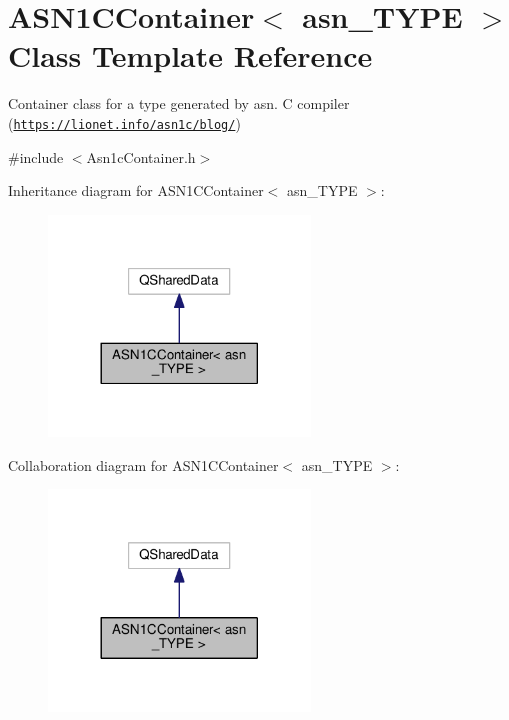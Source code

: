 \hypertarget{classASN1CContainer}{}\section{A\+S\+N1\+C\+Container$<$ asn\+\_\+\+T\+Y\+PE $>$ Class Template Reference}
\label{classASN1CContainer}


Container class for a type generated by asn. C compiler (\href{https://lionet.info/asn1c/blog/}{\tt https\+://lionet.\+info/asn1c/blog/})  




{\ttfamily \#include $<$Asn1c\+Container.\+h$>$}



Inheritance diagram for A\+S\+N1\+C\+Container$<$ asn\+\_\+\+T\+Y\+PE $>$\+:\nopagebreak
\begin{figure}[H]
\begin{center}
\leavevmode
\includegraphics[width=197pt]{classASN1CContainer__inherit__graph}
\end{center}
\end{figure}


Collaboration diagram for A\+S\+N1\+C\+Container$<$ asn\+\_\+\+T\+Y\+PE $>$\+:\nopagebreak
\begin{figure}[H]
\begin{center}
\leavevmode
\includegraphics[width=197pt]{classASN1CContainer__coll__graph}
\end{center}
\end{figure}
